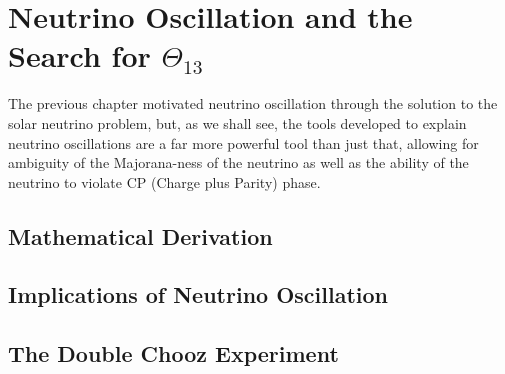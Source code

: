 \chapter{Neutrino Oscillation and the Search for $\Theta_{13}$}
\label{chap:Neutrino_Oscillation}
The previous chapter motivated neutrino oscillation through the solution to the solar neutrino problem, but, as we shall see, the tools developed to explain neutrino oscillations are a far more powerful tool than just that, allowing for ambiguity of the Majorana-ness of the neutrino as well as the ability of the neutrino to violate CP (Charge plus Parity) phase. 

\section{Mathematical Derivation}

\section{Implications of Neutrino Oscillation}


\section{The Double Chooz Experiment}
